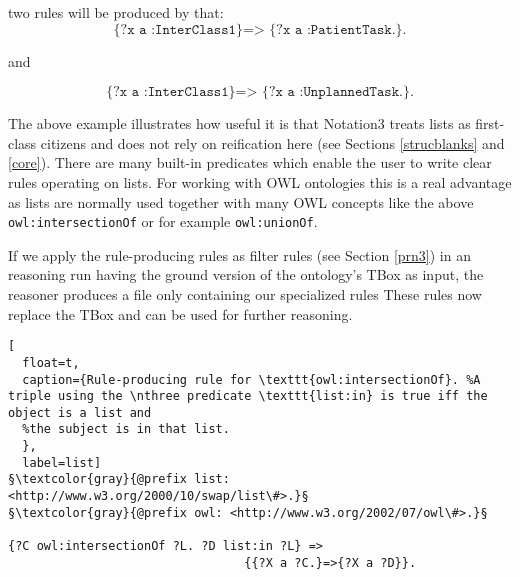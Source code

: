 \noindent two rules will be produced by that:  
\[\texttt{\{?x a :InterClass1\} => \{?x a :PatientTask.\}.}\]
\begin{center}
and
\end{center}
\[\texttt{\{?x a :InterClass1\} => \{?x a :UnplannedTask.\}.}\]

The above example illustrates how useful it is that Notation3 treats lists as first-class citizens and does not rely on reification here (see Sections \ref{strucblanks} and \ref{core}). 
There are many built-in predicates 
which enable the user to write 
clear rules operating on lists. For working with OWL ontologies this is a real advantage as lists are normally used
together with many OWL concepts 
like the above \texttt{owl:intersectionOf} or 
for example \texttt{owl:unionOf}.

If we apply the rule-producing rules as filter rules (see Section \ref{prn3}) in an \nthree reasoning run having the ground version of the ontology's TBox as input, the reasoner
produces a file only containing our specialized rules
% 
These rules now replace the TBox and can be used for further reasoning.


\begin{lstlisting}[
  float=t,
  caption={Rule-producing rule for \texttt{owl:intersectionOf}. %A triple using the \nthree predicate \texttt{list:in} is true iff the object is a list and 
  %the subject is in that list.  
  },
  label=list]
§\textcolor{gray}{@prefix list: <http://www.w3.org/2000/10/swap/list\#>.}§
§\textcolor{gray}{@prefix owl: <http://www.w3.org/2002/07/owl\#>.}§

{?C owl:intersectionOf ?L. ?D list:in ?L} => 
                                 {{?X a ?C.}=>{?X a ?D}}.
                              
\end{lstlisting}




